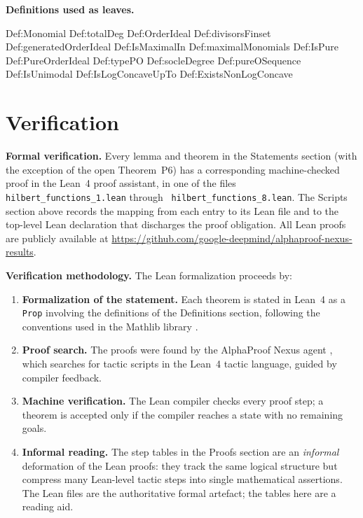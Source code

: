 \documentclass[11pt,reqno]{amsart}
\begin{document}
\medskip

\noindent%
\begin{minipage}[t]{\linewidth}
	\vspace{0pt}
	\textbf{Definitions used as leaves.}
	\smallskip
	\begin{verbatimbox}
		Def:Monomial        Def:totalDeg       Def:OrderIdeal
		Def:divisorsFinset  Def:generatedOrderIdeal
		Def:IsMaximalIn     Def:maximalMonomials
		Def:IsPure          Def:PureOrderIdeal Def:typePO
		Def:socleDegree     Def:pureOSequence  Def:IsUnimodal
		Def:IsLogConcaveUpTo Def:ExistsNonLogConcave
	\end{verbatimbox}
\end{minipage}


\section{Verification}

\label{sec:verification} 
\noindent\textbf{Formal verification.} Every lemma and theorem in the
Statements section (with the exception of the open Theorem~P6) has a
corresponding machine-checked proof in the Lean~4 proof assistant, in one of
the files \texttt{hilbert\_functions\_1.lean} through \texttt{%
hilbert\_functions\_8.lean}. The Scripts section above records the mapping
from each entry to its Lean file and to the top-level Lean declaration that
discharges the proof obligation. All Lean proofs are publicly available at %
\url{https://github.com/google-deepmind/alphaproof-nexus-results}.

\medskip\noindent\textbf{Verification methodology.} The Lean formalization
proceeds by:

\begin{enumerate}
\item \textbf{Formalization of the statement.} Each theorem is stated in
Lean~4 as a \texttt{Prop} involving the definitions of the Definitions
section, following the conventions used in the Mathlib library \cite%
{mathlib2020}.

\item \textbf{Proof search.} The proofs were found by the AlphaProof Nexus
agent \cite{tsoukalas2026}, which searches for tactic scripts in the Lean~4
tactic language, guided by compiler feedback.

\item \textbf{Machine verification.} The Lean compiler checks every proof
step; a theorem is accepted only if the compiler reaches a state with no
remaining goals.

\item \textbf{Informal reading.} The step tables in the Proofs section are
an \emph{informal} deformation of the Lean proofs: they track the same
logical structure but compress many Lean-level tactic steps into single
mathematical assertions. The Lean files are the authoritative formal
artefact; the tables here are a reading aid.
\end{enumerate}
\end{document}
